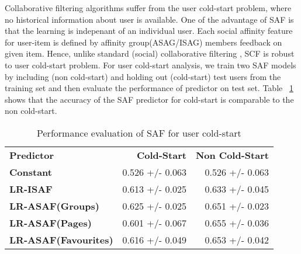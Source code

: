 Collaborative filtering algorithms suffer from the user cold-start problem,
where no historical information about user is available. One of the advantage of SAF is that 
the learning is indepenant of an individual user. Each social affinity feature for user-item is
defined by affinity group(ASAG/ISAG) members feedback on given item. 
Hence, unlike standard (social) collaborative filtering , SCF is robust to user 
cold-start problem.  For user cold-start analysis, we train two SAF models by 
including (non cold-start) and holding out (cold-start) test users from the 
training set and then evaluate the performance of predictor on test set. 
Table ~\ref{tab:coldstart} shows that the accuracy of the SAF predictor for 
cold-start is comparable to the non cold-start.  

\begin{table}[t!]
\centering
\begin{tabular}{|>{\small}l|>{\small}r|>{\small}r|}
\hline
& \multicolumn{2}{|c|}{\textbf{Accuracy}}\\
\hline
\textbf{Predictor}& \textbf{Cold-Start} & \textbf{Non Cold-Start}\\
\hline
\textbf{Constant} & 0.526  +/-  0.063 & 0.526  +/-  0.063 \\
\hline
\textbf{LR-ISAF} & 0.613 +/- 0.025 & 0.633  +/-  0.045 \\
\hline
\textbf{LR-ASAF(Groups)} & 0.625  +/-  0.025 & 0.651  +/-  0.023 \\
\hline
\textbf{LR-ASAF(Pages)} & 0.601  +/-  0.067 & 0.655  +/-  0.036 \\
\hline
\textbf{LR-ASAF(Favourites)} & 0.616  +/-  0.049 & 0.653  +/-  0.042\\
\hline
\end{tabular}
\caption{Performance evaluation of SAF for user cold-start}
\label{tab:coldstart}
\end{table}